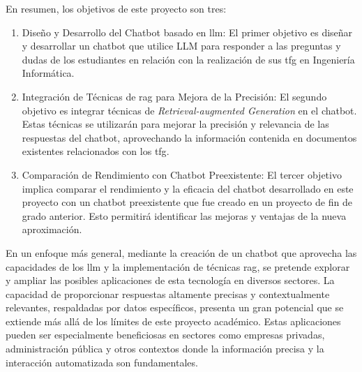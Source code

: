En resumen, los objetivos de este proyecto son tres:
\begin{enumerate}
    \item Diseño y Desarrollo del Chatbot basado en \acrshort{llm}: El primer objetivo es diseñar y desarrollar un chatbot que utilice \acrlong{LLM} para responder a las preguntas y dudas de los estudiantes en relación con la realización de sus \acrlong{tfg} en Ingeniería Informática.
    
    \item Integración de Técnicas de \acrshort{rag} para Mejora de la Precisión: El segundo objetivo es integrar técnicas de \textit{Retrieval-augmented Generation} en el chatbot. Estas técnicas se utilizarán para mejorar la precisión y relevancia de las respuestas del chatbot, aprovechando la información contenida en documentos existentes relacionados con los \acrshort{tfg}.

    \item Comparación de Rendimiento con Chatbot Preexistente: El tercer objetivo implica comparar el rendimiento y la eficacia del chatbot desarrollado en este proyecto con un chatbot preexistente que fue creado en un proyecto de fin de grado anterior. Esto permitirá identificar las mejoras y ventajas de la nueva aproximación.
    
\end{enumerate}

En un enfoque más general, mediante la creación de un chatbot que aprovecha las capacidades de los \acrshort{llm} y la implementación de técnicas \acrshort{rag}, se pretende explorar y ampliar las posibles aplicaciones de esta tecnología en diversos sectores. La capacidad de proporcionar respuestas altamente precisas y contextualmente relevantes, respaldadas por datos específicos, presenta un gran potencial que se extiende más allá de los límites de este proyecto académico. Estas aplicaciones pueden ser especialmente beneficiosas en sectores como empresas privadas, administración pública y otros contextos donde la información precisa y la interacción automatizada son fundamentales.






